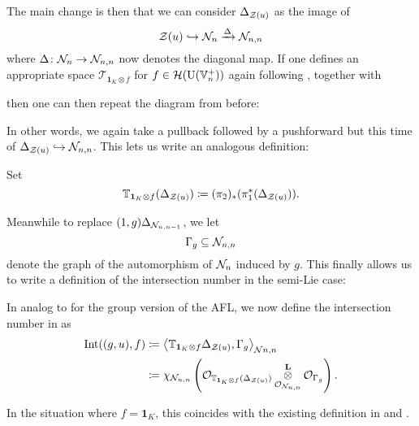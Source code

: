 The main change is then that we can consider $\Delta_{\mathcal Z(u)}$ as the image of
\[ \mathcal Z(u) \hookrightarrow \mathcal N_n \xrightarrow{\Delta} \mathcal N_{n,n} \]
where $\Delta \colon \mathcal N_n \to \mathcal N_{n,n}$ now denotes the diagonal map.
If one defines an appropriate space $\mathcal T_{\mathbf{1}_K \otimes f}$
for $f \in \mathcal H(\operatorname{U}(\mathbb V_n^+))$ again following \cite{ref:AFLspherical}, together with
\begin{center}
\end{center}
then one can then repeat the diagram from before:
\begin{center}
\end{center}
In other words, we again take a pullback followed by a pushforward
but this time of $\Delta_{\mathcal Z(u)} \hookrightarrow \mathcal N_{n,n}$.
This lets us write an analogous definition:
\begin{definition}
  Set
  \[ \mathbb T_{\mathbf{1}_K \otimes f} (\Delta_{\mathcal Z(u)})
    \coloneqq (\pi_2)_\ast(\pi_1^\ast(\Delta_{\mathcal Z(u)})). \]
\end{definition}
Meanwhile to replace $(1,g) \Delta_{\mathcal N_{n,n-1}}$, we let
\[ \Gamma_g \subseteq \mathcal N_{n,n} \]
denote the graph of the automorphism of $\mathcal N_n$ induced by $g$.
This finally allows us to write a definition of the intersection number in the semi-Lie case:
\begin{definition}
  [$\Int((g,u), f)$]
  \label{def:intersection_number_semi_lie_spherical}
  In analog to  for the group version of the AFL,
  we now define the intersection number in  as
  \begin{align*}
    \operatorname{Int}((g,u), f)
    &\coloneqq \left\langle \mathbb T_{\mathbf{1}_{K} \otimes f} \Delta_{\mathcal Z(u)}, \Gamma_g \right\rangle _{\mathcal N{n,n}} \\
    &\coloneqq \chi_{\mathcal N_{n,n}} \left(
      \mathcal{O}_{\mathbb T_{\mathbf{1}_K \otimes f}(\Delta_{\mathcal Z(u)})}
      \mathop{\otimes}^{\mathbf{L}}_{\mathcal{O}_{\mathcal N_{n,n}}} \mathcal{O}_{\Gamma_g} \right).
    \end{align*}
\end{definition}
In the situation where $f = \mathbf{1}_K$,
this coincides with the existing definition in \cite[Equation (4.9)]{ref:survey}
and \cite[Remark 3.1]{ref:annalsAFL}.

